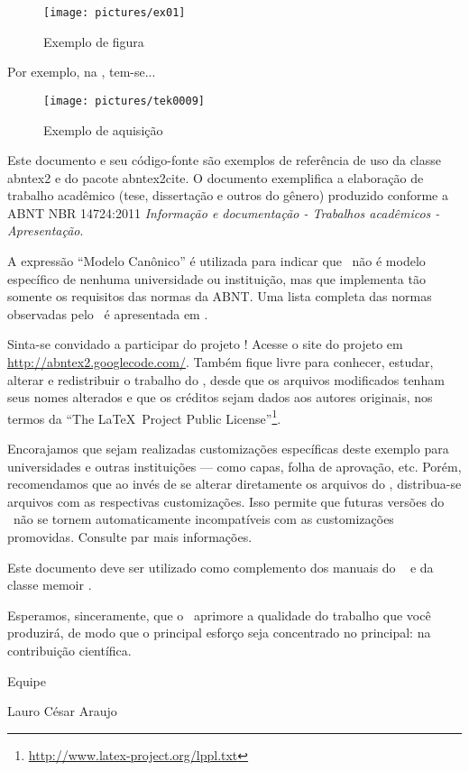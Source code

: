 \begin{figure}
	\centering
	\caption{Exemplo de figura}
	\texttt{[image: pictures/ex01]}
	\label{fig:ex01}
\end{figure}

Por exemplo, na , tem-se...


\begin{figure}
	\centering
	\texttt{[image: pictures/tek0009]}
	\caption{Exemplo de aquisição}
	\label{fig:tek0009}
\end{figure}

Este documento e seu código-fonte são exemplos de referência de uso da classe
\textsf{abntex2} e do pacote \textsf{abntex2cite}. O documento
exemplifica a elaboração de trabalho acadêmico (tese, dissertação e outros do
gênero) produzido conforme a ABNT NBR 14724:2011 \emph{Informação e documentação
- Trabalhos acadêmicos - Apresentação}.

A expressão ``Modelo Canônico'' é utilizada para indicar que \abnTeX{}\ não é
modelo específico de nenhuma universidade ou instituição, mas que implementa tão
somente os requisitos das normas da ABNT. Uma lista completa das normas
observadas pelo \abnTeX{}\ é apresentada em .

Sinta-se convidado a participar do projeto \abnTeX{}! Acesse o site do projeto em
\url{http://abntex2.googlecode.com/}. Também fique livre para conhecer,
estudar, alterar e redistribuir o trabalho do \abnTeX{}, desde que os arquivos
modificados tenham seus nomes alterados e que os créditos sejam dados aos
autores originais, nos termos da ``The \LaTeX{}\ Project Public
License''\footnote{\url{http://www.latex-project.org/lppl.txt}}.

Encorajamos que sejam realizadas customizações específicas deste exemplo para
universidades e outras instituições --- como capas, folha de aprovação, etc.
Porém, recomendamos que ao invés de se alterar diretamente os arquivos do
\abnTeX{}, distribua-se arquivos com as respectivas customizações.
Isso permite que futuras versões do \abnTeX{}~não se tornem automaticamente
incompatíveis com as customizações promovidas. Consulte
 par mais informações.

Este documento deve ser utilizado como complemento dos manuais do \abnTeX{}\
\cite{abntex2classe,abntex2cite,abntex2cite-alf} e da classe \textsf{memoir}
\cite{memoir}.

Esperamos, sinceramente, que o \abnTeX{}\ aprimore a qualidade do trabalho que
você produzirá, de modo que o principal esforço seja concentrado no principal:
na contribuição científica.

Equipe \abnTeX{}

Lauro César Araujo


